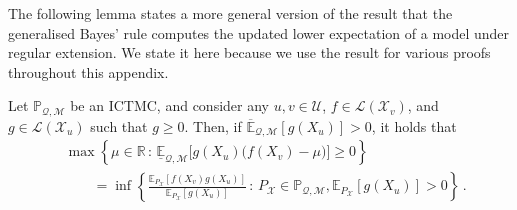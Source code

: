 \documentclass[twoside,11pt]{article}
\newcommand{\reals}{\mathbb{R}}
\newcommand{\states}{\mathcal{X}}
\newcommand{\lexp}{\underline{\mathbb{E}}_{\rateset,\mathcal{M}}}
\newcommand{\uexp}{\overline{\mathbb{E}}_{\rateset,\mathcal{M}}}
\newcommand{\gambles}{\mathcal{L}}
\newcommand{\rateset}{\mathcal{Q}}
\begin{document}
The following lemma states a more general version of the result that the generalised Bayes' rule computes the updated lower expectation of a model under regular extension. We state it here because we use the result for various proofs throughout this appendix.

\begin{lemma}\label{lemma:general_regular_extension}
Let $\mathbb{P}_{\rateset,\mathcal{M}}$ be an ICTMC, and consider any $u,v\in\mathcal{U}$, $f\in\gambles(\states_v)$, and $g\in\gambles(\states_u)$ such that $g\geq 0$. Then, if $\uexp[g(X_u)]>0$, it holds that
\begin{align*}
 &\max\left\{\mu\in\reals\,:\, \lexp\bigl[g(X_u)\bigl(f(X_v) - \mu\bigr)\bigr] \geq 0\right\} \\
 &\quad\quad = \inf\left\{ \frac{\mathbb{E}_{P_\states}[f(X_v)g(X_u)]}{\mathbb{E}_{P_\states}[g(X_u)]}\,:\,{P_\states}\in\mathbb{P}_{\rateset,\mathcal{M}}, \mathbb{E}_{P_\states}[g(X_u)]>0 \right\}\,.
\end{align*}
\end{lemma}
\end{document}
